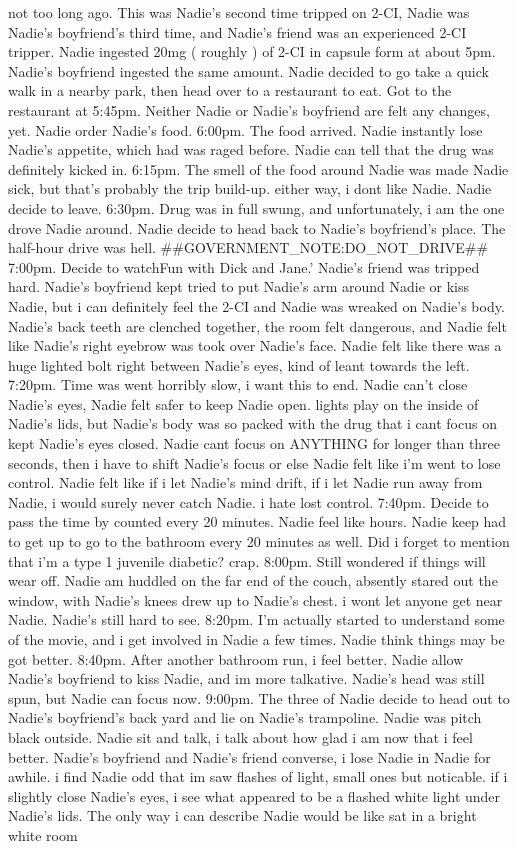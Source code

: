 \documentclass[12pt]{book}
\begin{document}
not too long ago. This was Nadie's second time tripped on 2-CI, Nadie was Nadie's boyfriend's third time, and Nadie's friend was an experienced 2-CI tripper. Nadie ingested 20mg ( roughly ) of 2-CI in capsule form at about 5pm. Nadie's boyfriend ingested the same amount. Nadie decided to go take a quick walk in a nearby park, then head over to a restaurant to eat. Got to the restaurant at 5:45pm. Neither Nadie or Nadie's boyfriend are felt any changes, yet. Nadie order Nadie's food. 6:00pm. The food arrived. Nadie instantly lose Nadie's appetite, which had was raged before. Nadie can tell that the drug was definitely kicked in. 6:15pm. The smell of the food around Nadie was made Nadie sick, but that's probably the trip build-up. either way, i dont like Nadie. Nadie decide to leave. 6:30pm. Drug was in full swung, and unfortunately, i am the one drove Nadie around. Nadie decide to head back to Nadie's boyfriend's place. The half-hour drive was hell. \#\#GOVERNMENT\_NOTE:DO\_NOT\_DRIVE\#\# 7:00pm. Decide to watchFun with Dick and Jane.' Nadie's friend was tripped hard. Nadie's boyfriend kept tried to put Nadie's arm around Nadie or kiss Nadie, but i can definitely feel the 2-CI and Nadie was wreaked on Nadie's body. Nadie's back teeth are clenched together, the room felt dangerous, and Nadie felt like Nadie's right eyebrow was took over Nadie's face. Nadie felt like there was a huge lighted bolt right between Nadie's eyes, kind of leant towards the left. 7:20pm. Time was went horribly slow, i want this to end. Nadie can't close Nadie's eyes, Nadie felt safer to keep Nadie open. lights play on the inside of Nadie's lids, but Nadie's body was so packed with the drug that i cant focus on kept Nadie's eyes closed. Nadie cant focus on ANYTHING for longer than three seconds, then i have to shift Nadie's focus or else Nadie felt like i'm went to lose control. Nadie felt like if i let Nadie's mind drift, if i let Nadie run away from Nadie, i would surely never catch Nadie. i hate lost control. 7:40pm. Decide to pass the time by counted every 20 minutes. Nadie feel like hours. Nadie keep had to get up to go to the bathroom every 20 minutes as well. Did i forget to mention that i'm a type 1 juvenile diabetic? crap. 8:00pm. Still wondered if things will wear off. Nadie am huddled on the far end of the couch, absently stared out the window, with Nadie's knees drew up to Nadie's chest. i wont let anyone get near Nadie. Nadie's still hard to see. 8:20pm. I'm actually started to understand some of the movie, and i get involved in Nadie a few times. Nadie think things may be got better. 8:40pm. After another bathroom run, i feel better. Nadie allow Nadie's boyfriend to kiss Nadie, and im more talkative. Nadie's head was still spun, but Nadie can focus now. 9:00pm. The three of Nadie decide to head out to Nadie's boyfriend's back yard and lie on Nadie's trampoline. Nadie was pitch black outside. Nadie sit and talk, i talk about how glad i am now that i feel better. Nadie's boyfriend and Nadie's friend converse, i lose Nadie in Nadie for awhile. i find Nadie odd that im saw flashes of light, small ones but noticable. if i slightly close Nadie's eyes, i see what appeared to be a flashed white light under Nadie's lids. The only way i can describe Nadie would be like sat in a bright white room 
\end{document}
